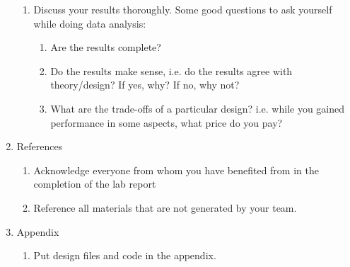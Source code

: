 \documentclass[letterpaper, 11pt]{article}
\begin{document}
\begin{enumerate}
\begin{enumerate}
			\item Discuss your results thoroughly. Some good questions to ask yourself while doing data analysis:
				\begin{enumerate}
					\item Are the results complete?
					\item Do the results make sense, i.e. do the results agree with theory/design? If yes, why? If no, why not?
					\item What are the trade-offs of a particular design? i.e. while you gained performance in some aspects, what price do you pay? 
				\end{enumerate}		
		\end{enumerate}
	\item References
		\begin{enumerate}
			\item Acknowledge everyone from whom you have benefited from in the completion of the lab report
			\item Reference all materials that are not generated by your team. 
		\end{enumerate}
	\item Appendix
		\begin{enumerate}
			\item Put design files and code in the appendix. 
		\end{enumerate}
\end{enumerate}
\end{document}
